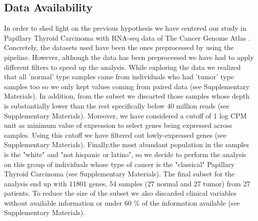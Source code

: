 \documentclass[9pt,twocolumn,twoside]{gsajnl}
\begin{document}
\subsection*{Data Availability}
In order to shed light on the previous hypothesis we have centered our study in Papillary Thyroid Carcinoma with RNA-seq data of The Cancer Genome Atlas \citep{tcga}. Concretely, the datasets used have been the ones preprocessed by \citet{Rahman2015} using the \citep{subread} pipeline. However, although the data has been preprocessed we have had to apply different filters to speed up the analysis. While exploring the data we realized that all 'normal' type samples came from  individuals who had 'tumor' type samples too so we only kept values coming from paired data (see Supplementary Materials). In addition, from the subset we discarted those samples whose depth is substantially lower than the rest specifically below 40 million reads (see Supplementary Materials). Moreover, we have considered a cutoff of 1 log CPM unit as minimum value of expression to select genes being expressed across samples. Using this cutoff we have filtered out lowly-expressed genes (see Supplementary Materials). Finally,the most abundant population in the samples is the "white" and "not hispanic or latino", so we decide to perform the analysis on this group of individuals whose type of cancer is the "classical" Papillary Thyroid Carcinoma (see Supplementary Materials). The final subset for the analysis end up with 11801 genes, 54 samples (27 normal and 27 tumor) from 27 patients. To reduce the size of the subset we also discarded clinical variables without available information or under 60 \% of the information available (see Supplementary Materials). 
\end{document}
